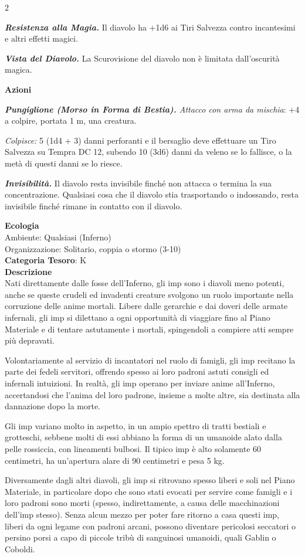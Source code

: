 \begin{multicols}{2}
{\emph{\textbf{Resistenza alla Magia.}} Il diavolo ha +1d6 ai Tiri Salvezza contro incantesimi e altri effetti magici.

\emph{\textbf{Vista del Diavolo.}} La Scurovisione del diavolo non è limitata dall'oscurità magica.

\textbf{Azioni}

\emph{\textbf{Pungiglione (Morso in Forma di Bestia).} Attacco con arma da mischia}: +4 a colpire, portata 1 m, una creatura.

\emph{Colpisce:} 5 (1d4 + 3) danni perforanti e il bersaglio deve effettuare un Tiro Salvezza su Tempra DC 12, subendo 10 (3d6) danni da veleno se lo fallisce, o la metà di questi danni se lo riesce.

\emph{\textbf{Invisibilità.}} Il diavolo resta invisibile finché non attacca o termina la sua concentrazione. Qualsiasi cosa che il diavolo stia trasportando o indossando, resta invisibile finché rimane in contatto con il diavolo.

\textbf{Ecologia}\\
Ambiente: Qualsiasi (Inferno)\\
Organizzazione: Solitario, coppia o stormo (3-10)\\
\textbf{Categoria Tesoro}: K\\
\textbf{Descrizione}\\
Nati direttamente dalle fosse dell'Inferno, gli imp sono i diavoli meno potenti, anche se queste crudeli ed invadenti creature svolgono un ruolo importante nella corruzione delle anime mortali. Libere dalle gerarchie e dai doveri delle armate infernali, gli imp si dilettano a ogni opportunità di viaggiare fino al Piano Materiale e di tentare astutamente i mortali, spingendoli a compiere atti sempre più depravati.

Volontariamente al servizio di incantatori nel ruolo di famigli, gli imp recitano la parte dei fedeli servitori, offrendo spesso ai loro padroni astuti consigli ed infernali intuizioni. In realtà, gli imp operano per inviare anime all'Inferno, accertandosi che l'anima del loro padrone, insieme a molte altre, sia destinata alla dannazione dopo la morte.

Gli imp variano molto in aspetto, in un ampio spettro di tratti bestiali e grotteschi, sebbene molti di essi abbiano la forma di un umanoide alato dalla pelle rossiccia, con lineamenti bulbosi. Il tipico imp è alto solamente 60 centimetri, ha un'apertura alare di 90 centimetri e pesa 5 kg.

Diversamente dagli altri diavoli, gli imp si ritrovano spesso liberi e soli nel Piano Materiale, in particolare dopo che sono stati evocati per servire come famigli e i loro padroni sono morti (spesso, indirettamente, a causa delle macchinazioni dell'imp stesso). Senza alcun mezzo per poter fare ritorno a casa questi imp, liberi da ogni legame con padroni arcani, possono diventare pericolosi seccatori o persino porsi a capo di piccole tribù di sanguinosi umanoidi, quali Gablin o Coboldi.

}
\end{multicols}
